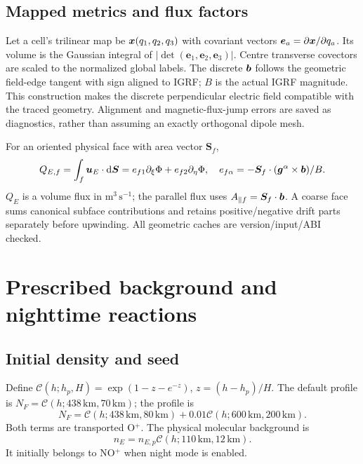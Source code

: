 \subsection{Mapped metrics and flux factors}
Let a cell's trilinear map be $\bm x(q_1,q_2,q_3)$ with covariant vectors
$\bm e_a=\partial\bm x/\partial q_a$. Its volume is the Gaussian integral
of $|\det(\bm e_1,\bm e_2,\bm e_3)|$. Centre transverse covectors are scaled
to the normalized global labels. The discrete $\bm b$ follows the geometric
field-edge tangent with sign aligned to IGRF; $B$ is the actual IGRF magnitude.
This construction makes the discrete perpendicular electric field compatible
with the traced geometry. Alignment and magnetic-flux-jump errors are saved
as diagnostics, rather than assuming an exactly orthogonal dipole mesh.

For an oriented physical face with area vector $\bm S_f$,
\begin{equation}
 Q_{E,f}=\int_f\bm u_E\cdot\mathrm d\bm S
 =e_{f1}\partial_\xi\Phi+e_{f2}\partial_\eta\Phi,\quad
 e_{f\alpha}=-\bm S_f\cdot(\bm g^\alpha\times\bm b)/B.
\end{equation}
$Q_E$ is a volume flux in $\mathrm{m^3\,s^{-1}}$; the parallel flux uses
$A_{\parallel f}=\bm S_f\cdot\bm b$. A coarse face sums canonical subface
contributions and retains positive/negative drift parts separately before
upwinding. All geometric caches are version/input/ABI checked.

\section{Prescribed background and nighttime reactions}
\subsection{Initial density and seed}
Define $\mathcal C(h;h_p,H)=\exp(1-z-e^{-z})$, $z=(h-h_p)/H$.
The default profile is $N_F=\mathcal C(h;438\,\mathrm{km},70\,\mathrm{km})$;
the  profile is
\begin{equation}
 N_F=\mathcal C(h;438\,\mathrm{km},80\,\mathrm{km})+
 0.01\mathcal C(h;600\,\mathrm{km},200\,\mathrm{km}).
\end{equation}
Both terms are transported O$^+$. The physical molecular background is
\begin{equation}
n_E=n_{E,p}\mathcal C(h;110\,\mathrm{km},12\,\mathrm{km}).
\end{equation}
It initially belongs to NO$^+$ when night mode is enabled.

